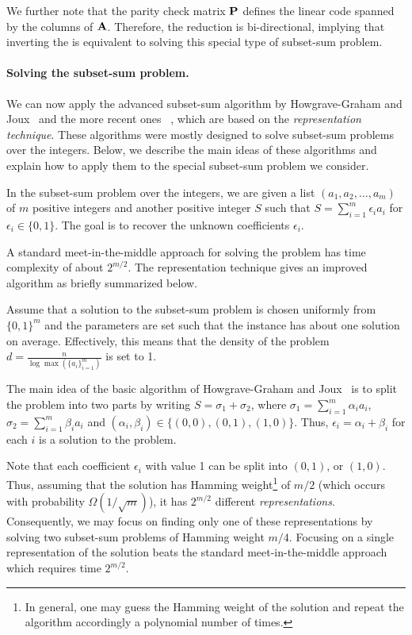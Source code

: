 We further note that the parity check matrix $\mat{P}$ defines the 
linear code spanned by the columns of $\mat{A}$.
Therefore, the reduction is bi-directional, 
implying that inverting the \ttOWF is equivalent to solving 
this special type of subset-sum problem.


\paragraph{Solving the subset-sum problem.}
We can now apply the advanced subset-sum algorithm by
Howgrave{-}Graham and Joux~\cite{Howgrave-GrahamJ10} and the more recent ones
~\cite{BeckerCJ11,BonnetainBSS20},
which are based on the \emph{representation technique}.
These algorithms were mostly designed to solve subset-sum problems over the integers.
Below, we describe the main ideas of these algorithms
and explain how to apply them to the special subset-sum problem
we consider.

In the subset-sum problem over the integers,
we are given a list $(a_1,a_2,\ldots,a_m)$ of $m$ positive  integers
and another positive integer $S$ such that $S = \sum_{i=1}^{m} \epsilon_i a_i$
for $\epsilon_i \in \{0,1\}$. The goal is to recover the unknown coefficients $\epsilon_i$.

A standard meet-in-the-middle approach for solving the problem has time complexity of about $2^{m/2}$.
The representation technique gives an improved algorithm as briefly summarized below.

Assume that a solution to the subset-sum problem is chosen uniformly from $\{0,1\}^m$
and the parameters are set such that the instance has about one solution on average. Effectively, this means that the density of the problem $d = \tfrac{n}{\log \max(\{a_i\}_{i=1}^{m})}$ is set to 1.

The main idea of the basic algorithm of Howgrave{-}Graham and Joux~\cite{Howgrave-GrahamJ10}
is to split the problem into two parts by writing
$S = \sigma_1 + \sigma_2$,
where $\sigma_1 = \sum_{i=1}^{m} \alpha_i a_i$, $\sigma_2 = \sum_{i=1}^{m} \beta_i a_i$
and $(\alpha_i,\beta_i) \in \{(0,0),(0,1),(1,0)\}$.
Thus, $\epsilon_i = \alpha_i + \beta_i$ for each $i$ is a solution to the problem.

Note that each coefficient $\epsilon_i$ with value 1 can be split into $(0,1)$, or $(1,0)$.
Thus, assuming that the solution has Hamming weight\footnote{In general, one
may guess the Hamming weight of the solution and
repeat the algorithm accordingly a polynomial number of times.} of $m/2$
(which occurs with probability $\Omega(1/\sqrt{m})$),
it has $2^{m/2}$ different \emph{representations}.
Consequently, we may focus on finding only one of these representations
by solving two subset-sum problems of Hamming weight $m/4$.
Focusing on a single representation of the solution
beats the standard meet-in-the-middle approach which requires time $2^{m/2}$.

